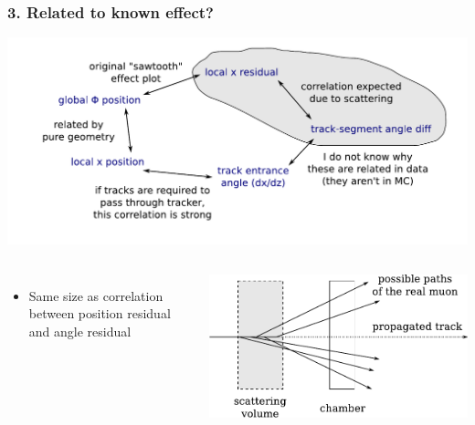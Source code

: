 \documentclass[compress]{beamer}
\begin{document}
\begin{frame}
\frametitle{3. Related to known effect?}

\includegraphics[width=0.85\linewidth]{map_of_correlations4.pdf}

\vspace{-1 cm}
\begin{columns}

\begin{itemize}
\item Same size as correlation between position residual and angle residual
\end{itemize}

\includegraphics[width=\linewidth]{sawtooth_diagram.pdf}


\end{columns}
\end{frame}
\end{document}
